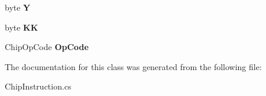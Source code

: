\begin{DoxyCompactItemize}
\item 
\hypertarget{class_eimu_1_1_core_1_1_systems_1_1_s_chip8_1_1_chip_instruction_a188ad8f3ea1109db5e94307941b14ceb}{
byte {\bfseries Y}}
\label{class_eimu_1_1_core_1_1_systems_1_1_s_chip8_1_1_chip_instruction_a188ad8f3ea1109db5e94307941b14ceb}

\item 
\hypertarget{class_eimu_1_1_core_1_1_systems_1_1_s_chip8_1_1_chip_instruction_a706eaf9ad9a9dbe01a1f34efa9684144}{
byte {\bfseries KK}}
\label{class_eimu_1_1_core_1_1_systems_1_1_s_chip8_1_1_chip_instruction_a706eaf9ad9a9dbe01a1f34efa9684144}

\item 
\hypertarget{class_eimu_1_1_core_1_1_systems_1_1_s_chip8_1_1_chip_instruction_ad9cb2385f1b7d6239ca59d0b7201711d}{
ChipOpCode {\bfseries OpCode}}
\label{class_eimu_1_1_core_1_1_systems_1_1_s_chip8_1_1_chip_instruction_ad9cb2385f1b7d6239ca59d0b7201711d}

\end{DoxyCompactItemize}


The documentation for this class was generated from the following file:\begin{DoxyCompactItemize}
\item 
ChipInstruction.cs\end{DoxyCompactItemize}
